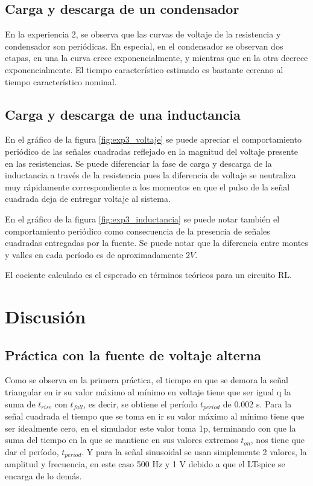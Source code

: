 \documentclass[letterpaper,11pt]{article} %
\begin{document}
\subsection{Carga y descarga de un condensador}
En la experiencia 2, se observa que las curvas de voltaje de la resistencia y condensador son periódicas. En especial, en el condensador se observan dos etapas, en una la curva crece exponencialmente, y mientras que en la otra decrece exponencialmente. El tiempo característico estimado es bastante cercano al tiempo característico nominal.

\subsection{Carga y descarga de una inductancia}

En el gráfico de la figura \ref{fig:exp3_voltaje} se puede apreciar el comportamiento periódico de las señales cuadradas reflejado en la magnitud del voltaje presente en las resistencias. Se puede diferenciar la fase de carga y descarga de la inductancia a través de la resistencia pues la diferencia de voltaje se neutraliza muy rápidamente correspondiente a los momentos en que el pulso de la señal cuadrada deja de entregar voltaje al sistema.

En el gráfico de la figura \ref{fig:exp3_inductancia} se puede notar también el comportamiento periódico como consecuencia de la presencia de señales cuadradas entregadas por la fuente. Se puede notar que la diferencia entre montes y valles en cada período es de aproximadamente $2V$.

El cociente calculado es el esperado en términos teóricos para un circuito RL.

\newpage
\section{Discusión}
\subsection{Práctica con la fuente de voltaje alterna}
Como se observa en la primera práctica, el tiempo en que se demora la señal triangular en ir su valor máximo al mínimo en voltaje tiene que ser igual q la suma de $t_{rise}$ con $t_{fall}$, es decir, se obtiene el período $t_{period}$ de 0.002 s. Para la señal cuadrada el tiempo que se toma en ir su valor máximo al mínimo tiene que ser idealmente cero, en el simulador este valor toma 1p, terminando con que la suma del tiempo en la que se mantiene en sus valores extremos $t_{on}$, nos tiene que dar el período, $t_{period}$. Y para la señal sinusoidal se usan simplemente 2 valores, la amplitud y frecuencia, en este caso 500 Hz y 1 V debido a que el LTspice se encarga de lo demás. 
\end{document}
